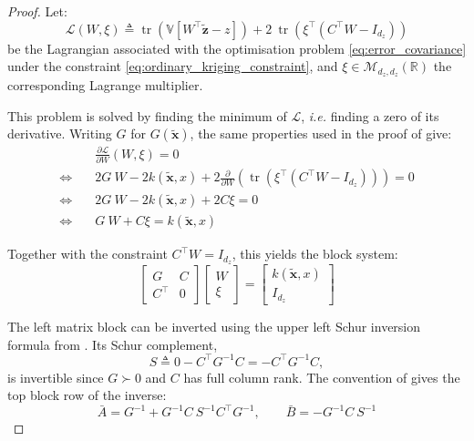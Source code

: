 \begin{proof}
	Let:
	\begin{equation}
		\mathcal{L}(W,\xi)\triangleq\operatorname{tr}\left(\mathbb{V}\left[W^\top\tilde{\mathbf{z}}-z\right]\right)+2\:\operatorname{tr}\left(\xi^\top\left(C^\top W-I_{d_z}\right)\right)
	\end{equation}
	be the Lagrangian associated with the optimisation problem \eqref{eq:error_covariance} under the constraint \eqref{eq:ordinary_kriging_constraint}, and $\xi\in\mathcal{M}_{d_z,d_z}(\mathbb{R})$ the corresponding Lagrange multiplier.

	This problem is solved by finding the minimum of $\mathcal{L}$, \textit{i.e.} finding a zero of its derivative. Writing $G$ for $G(\tilde{\mathbf{x}})$, the same properties used in the proof of  give:
	\begin{equation}
		\begin{aligned}
		&\frac{\partial\mathcal{L}}{\partial W}(W,\xi)=0\\
		\iff\quad&2G\:W-2k(\tilde{\mathbf{x}},x)+2\frac{\partial}{\partial W}\left(\operatorname{tr}\left(\xi^\top\left(C^\top W-I_{d_z}\right)\right)\right)=0\\
		\iff\quad&2G\:W-2k(\tilde{\mathbf{x}},x)+2C\xi=0\\
		\iff\quad&G\:W+C\xi=k(\tilde{\mathbf{x}},x)
		\end{aligned}
	\end{equation}

	Together with the constraint $C^\top W=I_{d_z}$, this yields the block system:
	\begin{equation}
		\begin{bmatrix}
		G&C\\C^\top&0
		\end{bmatrix}\begin{bmatrix}
		W\\\xi
		\end{bmatrix}=\begin{bmatrix}
		k(\tilde{\mathbf{x}},x)\\I_{d_z}
		\end{bmatrix}
	\end{equation}

	The left matrix block can be inverted using the upper left Schur inversion formula from . Its Schur complement,
	\begin{equation}
		S\triangleq0-C^\top G^{-1}C=-C^\top G^{-1}C,
	\end{equation}
	is invertible since $G\succ0$ and $C$ has full column rank. The convention of  gives the top block row of the inverse:
	\begin{equation}
		\bar{A}=G^{-1}+G^{-1}C\:S^{-1}C^\top G^{-1},\qquad\bar{B}=-G^{-1}C\:S^{-1}
	\end{equation}


\end{proof}
